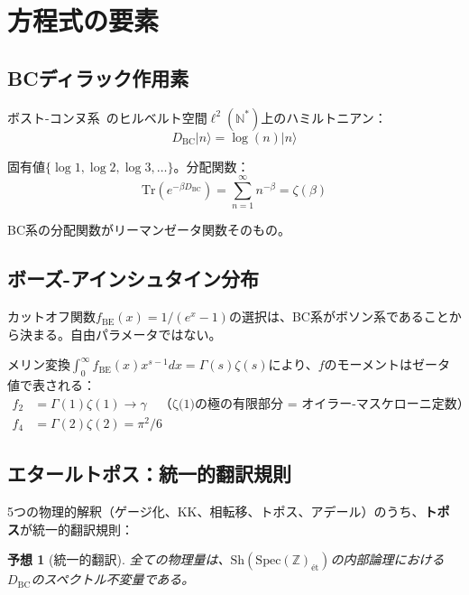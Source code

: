 \documentclass[11pt,a4paper]{article}
\newtheorem{conjecture}[theorem]{予想}
\newcommand{\Spec}{\mathrm{Spec}}
\newcommand{\Sh}{\mathrm{Sh}}
\begin{document}
\section{方程式の要素}

\subsection{BCディラック作用素}

ボスト-コンヌ系~\cite{BostConnes1995}のヒルベルト空間$\ell^2(\mathbb{N}^*)$上のハミルトニアン：
\begin{equation}
D_{\mathrm{BC}}|n\rangle = \log(n)|n\rangle
\end{equation}

固有値$\{\log 1, \log 2, \log 3, \ldots\}$。分配関数：
\begin{equation}
\mathrm{Tr}(e^{-\beta D_{\mathrm{BC}}}) = \sum_{n=1}^{\infty} n^{-\beta} = \zeta(\beta)
\end{equation}

BC系の分配関数がリーマンゼータ関数そのもの。

\subsection{ボーズ-アインシュタイン分布}

カットオフ関数$f_{\mathrm{BE}}(x) = 1/(e^x - 1)$の選択は、BC系がボソン系であることから決まる。自由パラメータではない。

メリン変換$\int_0^{\infty} f_{\mathrm{BE}}(x) x^{s-1} dx = \Gamma(s)\zeta(s)$により、$f$のモーメントはゼータ値で表される：
\begin{align}
f_2 &= \Gamma(1)\zeta(1) \to \gamma \quad \text{（ζ(1)の極の有限部分 = オイラー-マスケローニ定数）} \\
f_4 &= \Gamma(2)\zeta(2) = \pi^2/6
\end{align}

\subsection{エタールトポス：統一的翻訳規則}

5つの物理的解釈（ゲージ化、KK、相転移、トポス、アデール）のうち、\textbf{トポス}が統一的翻訳規則：

\begin{conjecture}[統一的翻訳]
全ての物理量は、$\Sh(\Spec(\mathbb{Z})_{\text{ét}})$の内部論理における$D_{\mathrm{BC}}$のスペクトル不変量である。
\end{conjecture}
\end{document}

